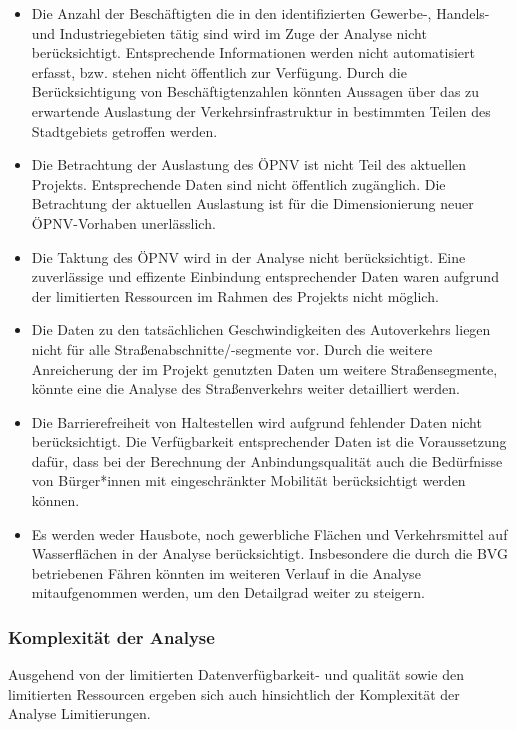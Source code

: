 \begin{itemize}

    \item Die Anzahl der Beschäftigten die in den identifizierten Gewerbe-, Handels- und Industriegebieten tätig sind wird im Zuge der Analyse nicht berücksichtigt. Entsprechende Informationen werden nicht automatisiert erfasst, bzw. stehen nicht öffentlich zur Verfügung. Durch die Berücksichtigung von Beschäftigtenzahlen könnten Aussagen über das zu erwartende Auslastung der Verkehrsinfrastruktur in bestimmten Teilen des Stadtgebiets getroffen werden.

    \item Die Betrachtung der Auslastung des ÖPNV ist nicht Teil des aktuellen Projekts. Entsprechende Daten sind nicht öffentlich zugänglich. Die Betrachtung der aktuellen Auslastung ist für die Dimensionierung neuer ÖPNV-Vorhaben unerlässlich.

    \item Die Taktung des ÖPNV wird in der Analyse nicht berücksichtigt​. Eine zuverlässige und effizente Einbindung entsprechender Daten waren aufgrund der limitierten Ressourcen im Rahmen des Projekts nicht möglich.

    \item Die Daten zu den tatsächlichen Geschwindigkeiten des Autoverkehrs liegen nicht für alle Straßenabschnitte/-segmente vor​. Durch die weitere Anreicherung der im Projekt genutzten Daten um weitere Straßensegmente, könnte eine die Analyse des Straßenverkehrs weiter detailliert werden.

    \item Die Barrierefreiheit von Haltestellen wird aufgrund fehlender Daten nicht berücksichtigt​. Die Verfügbarkeit entsprechender Daten ist die Voraussetzung dafür, dass bei der Berechnung der Anbindungsqualität auch die Bedürfnisse von Bürger*innen mit eingeschränkter Mobilität berücksichtigt werden können.

    \item Es werden weder Hausbote, noch gewerbliche Flächen und Verkehrsmittel auf Wasserflächen in der Analyse berücksichtigt. Insbesondere die durch die BVG betriebenen Fähren könnten im weiteren Verlauf in die Analyse mitaufgenommen werden, um den Detailgrad weiter zu steigern.

\end{itemize}


\subsubsection{Komplexität der Analyse}
Ausgehend von der limitierten Datenverfügbarkeit- und qualität sowie den limitierten Ressourcen ergeben sich auch hinsichtlich der Komplexität der Analyse Limitierungen.

